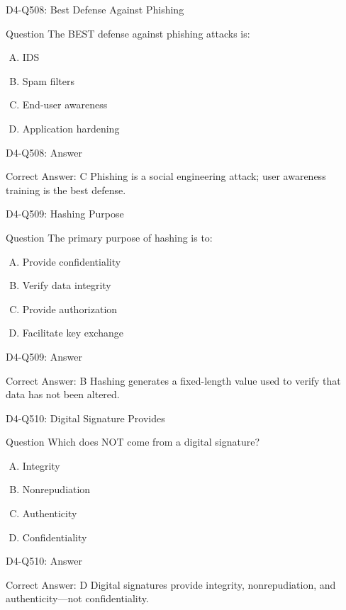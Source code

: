 \documentclass{beamer}
\begin{document}
\begin{frame}{D4-Q508: Best Defense Against Phishing}
	\begin{block}{Question}
		The BEST defense against phishing attacks is:
	\end{block}
	\begin{enumerate}[(A)]
		\item IDS
		\item Spam filters
		\item End-user awareness
		\item Application hardening
	\end{enumerate}
\end{frame}
\begin{frame}{D4-Q508: Answer}
	\begin{block}{Correct Answer: C}
		Phishing is a social engineering attack; user awareness training is the best defense.
	\end{block}
\end{frame}

\begin{frame}{D4-Q509: Hashing Purpose}
	\begin{block}{Question}
		The primary purpose of hashing is to:
	\end{block}
	\begin{enumerate}[(A)]
		\item Provide confidentiality
		\item Verify data integrity
		\item Provide authorization
		\item Facilitate key exchange
	\end{enumerate}
\end{frame}
\begin{frame}{D4-Q509: Answer}
	\begin{block}{Correct Answer: B}
		Hashing generates a fixed-length value used to verify that data has not been altered.
	\end{block}
\end{frame}

\begin{frame}{D4-Q510: Digital Signature Provides}
	\begin{block}{Question}
		Which does NOT come from a digital signature?
	\end{block}
	\begin{enumerate}[(A)]
		\item Integrity
		\item Nonrepudiation
		\item Authenticity
		\item Confidentiality
	\end{enumerate}
\end{frame}
\begin{frame}{D4-Q510: Answer}
	\begin{block}{Correct Answer: D}
		Digital signatures provide integrity, nonrepudiation, and authenticity—not confidentiality.
	\end{block}
\end{frame}
\end{document}
